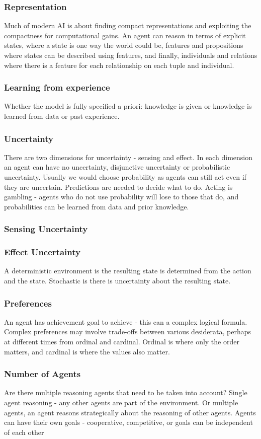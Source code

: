 \documentclass[a4paper]{article}
\theoremstyle{plain}
\theoremstyle{definition}
\theoremstyle{remark}
\begin{document}
	\subsubsection{Representation}
	Much of modern AI is about finding compact representations and exploiting the compactness for computational gains. An agent can reason in terms of explicit states, where a state is one way the world could be, features and propositions where states can be described using features, and finally, individuals and relations where there is a feature for each relationship on each tuple and individual. 
\subsubsection{Learning from experience}
Whether the model is fully specified a priori: knowledge is given or knowledge is learned from data or past experience.
\subsubsection{Uncertainty}
There are two dimensions for uncertainty - sensing and effect. In each dimension an agent can have no uncertainty, disjunctive uncertainty or probabilistic uncertainty. Usually we would choose probability as agents can still act even if they are uncertain. Predictions are needed to decide what to do. Acting is gambling - agents who do not use probability will lose to those that do, and probabilities can be learned from data and prior knowledge.
\subsubsection{Sensing Uncertainty}
\subsubsection{Effect Uncertainty}
A deterministic environment is the resulting state is determined from the action and the state. Stochastic is there is uncertainty about the resulting state.
\subsubsection{Preferences}
An agent has achievement goal to achieve - this can a complex logical formula. Complex preferences may involve trade-offs between various desiderata, perhaps at different times from ordinal and cardinal. Ordinal is where only the order matters, and cardinal is where the values also matter.
\subsubsection{Number of Agents}
Are there multiple reasoning agents that need to be taken into account? Single agent reasoning - any other agents are part of the environment. Or multiple agents, an agent reasons strategically about the reasoning of other agents. Agents can have their own goals - cooperative, competitive, or goals can be independent of each other
\end{document}
